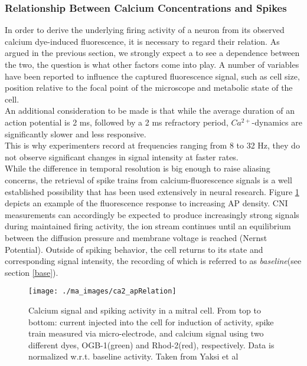 \documentclass[titlepage]{article}
\begin{document}
\subsubsection{Relationship Between Calcium Concentrations and Spikes}\label{calcium}
In order to derive the underlying firing activity of a neuron from its observed calcium dye-induced fluorescence, it is necessary to regard their relation. 
As argued in the previous section, we strongly expect a to see a dependence between the two, the question is what other factors come into play.
A number of variables have been reported to influence the captured fluorescence signal, such as cell size, position relative to the focal point of the microscope and metabolic state of the cell\cite{dombeck_two-photon_2014}.\\
An additional consideration to be made is that while the average duration of an action potential is 2 ms, followed by a 2 ms refractory period, $Ca^{2+}$-dynamics are significantly slower and less responsive.\\
This is why experimenters record at frequencies ranging from 8 to 32 Hz\cite{denk_two-photon_1990}\cite{dombeck_imaging_2007}\cite{dombeck_two-photon_2014}, they do not observe significant changes in signal intensity at faster rates.\\
While the difference in temporal resolution is big enough to raise aliasing concerns, the retrieval of spike trains from calcium-fluorescence signals is a well established possibility that has been used extensively in neural research\cite{miyazaki_simultaneous_2015}. Figure \ref{fig:ca2_apRelation} depicts an example of the fluorescence response to increasing AP density. CNI measurements can accordingly be expected to produce increasingly strong signals during maintained firing activity, the ion stream continues until an equilibrium between the diffusion pressure and membrane voltage is reached (Nernst Potential)\cite{nover_lehrbuch_2005}. Outside of spiking behavior, the cell returns to its state and corresponding signal intensity, the recording of which is referred to as \emph{baseline}(see section \ref{base}).
\begin{figure}[H]
\centering
\texttt{[image: ./ma\_images/ca2\_apRelation]}
\caption{Calcium signal and spiking activity in a mitral cell. From top to bottom: current injected into the cell for induction of activity, spike train measured via micro-electrode, and calcium signal using two different dyes, OGB-1(green) and Rhod-2(red), respectively. Data is normalized w.r.t. baseline activity. Taken from Yaksi et al\cite{yaksi_reconstruction_2006}}
\label{fig:ca2_apRelation}
\end{figure}
\end{document}
